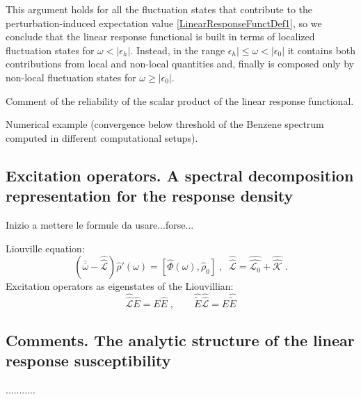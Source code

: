 \documentclass[reprint,aps,prb]{revtex4-1}
\newcommand{\dd}{{\rm d}}
\renewcommand{\r}{{\bf r}}
\newcommand{\eps}{\epsilon}
\newcommand{\bomega}{\bar\omega}
\newcommand{\bbomega}{\bar{\bomega}}
\newcommand{\be}{\begin{equation}}
\newcommand{\ee}{\end{equation}}
\newcommand{\qq}{\qquad}
\newcommand{\lb}{\label}
\newcommand{\op}[1]{\hat {#1}}
\newcommand{\sop}[1]{\op{\op {#1}}}
\newcommand{\commutator}[2]{\left[ {#1} , {#2} \right]}
\newcommand{\trace}[1]{\mathrm{tr}\left(#1\right)}
\newcommand{\dmnot}{\op{\rho}_0}
\newcommand{\dm}{\op{\rho}}
\newcommand{\hnot}{\op{H}_0}
\newcommand{\Liouv}{\sop{\mathcal L}}
\newcommand{\Liouvnot}{\sop{\mathcal L_0}}
\newcommand{\coupl}{\sop{\mathcal K}}
\begin{document}
This argument holds for all the fluctuation states that contribute to the perturbation-induced expectation value \eqref{LinearResponseFunctDef1}, so we conclude that
the linear response functional is built in terms of localized fluctuation states for $\omega < |\eps_h|$. Instead, in the range $\eps_h|\leq\omega<|\eps_0|$ it contains both
contributions from local and non-local quantities and, finally is composed only by non-local fluctuation states for $\omega\geq|\eps_0|$. 

Comment of the reliability of the scalar product of the linear response functional.

Numerical example (convergence below threshold of the Benzene spectrum computed in different computational setups).



\subsection{Excitation operators. A spectral decomposition representation for the response density}

Inizio a mettere le formule da usare...forse...

Liouville equation:
\be\lb{LiouvillianRhopomegaDef1}
\left(\bbomega - \Liouv\right) \dm'(\omega) =  \commutator{\op\Phi(\omega)}{\dmnot}\;,\;\; 
\Liouv = \Liouvnot + \coupl \;.
\ee
Excitation operators as eigenstates of the Liouvillian:
\be
\Liouv \op E = E \op E \;, \qq
 \op{\tilde E} \Liouv = E \op{\tilde E}
\ee

\subsection{Comments. The analytic structure of the linear response susceptibility}

...........



\end{document}
